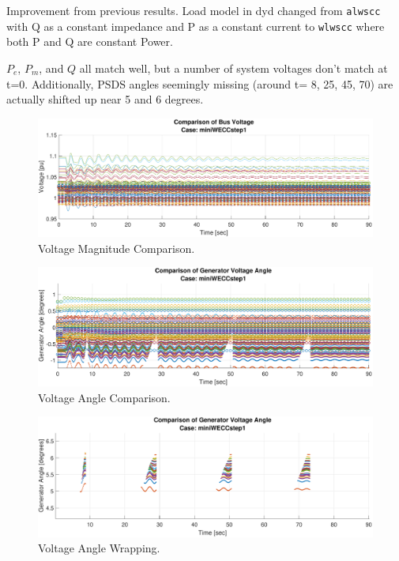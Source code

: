 \documentclass[12pt]{article}
\begin{document}
Improvement from previous results. Load model in dyd changed from \verb|alwscc| with Q as a constant impedance and P as a constant current to \verb|wlwscc| where both P and Q are constant Power.\\
\pagebreak

$P_e$, $P_m$, and $Q$ all match well, but a number of system voltages don't match at t=0. Additionally, PSDS angles seemingly missing (around t= 8, 25, 45, 70) are actually shifted up near 5 and 6 degrees.

	\begin{figure}[h!]
			\centering
			\includegraphics[width=\linewidth]{miniWECCstep1V}\vspace{-1em}
			\caption{Voltage Magnitude Comparison.}
			\label{vMag}		 
	\end{figure}\vspace{-2em}
	\begin{figure}[h!]
				\centering
				\includegraphics[width=\linewidth]{miniWECCstep1Angle}  \vspace{-2em}
				\caption{Voltage Angle Comparison.} 
				\label{vAng}
	\end{figure}\vspace{-2em}
	\begin{figure}[h!]
				\centering
				\includegraphics[width=\linewidth]{miniWECCstep1MissingAngle}  \vspace{-2em}
				\caption{Voltage Angle Wrapping.} 
				\label{vAng}
	\end{figure}\vspace{-2em}
\pagebreak
\end{document}
